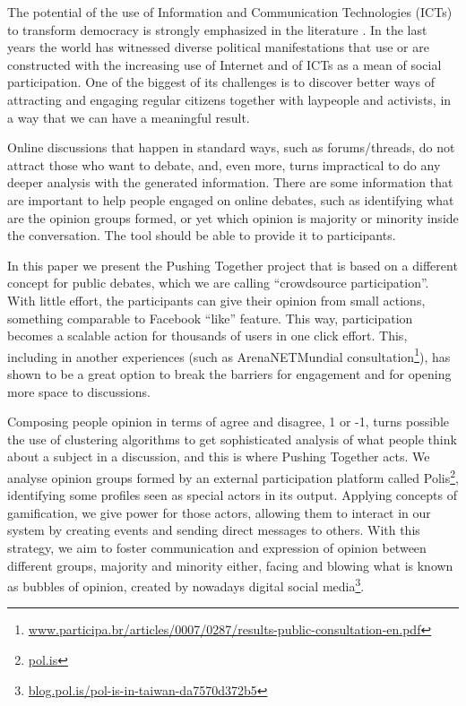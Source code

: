 \documentclass{llncs}
\begin{document}
  The potential of the use of Information and Communication Technologies (ICTs)
to transform democracy is strongly emphasized in the literature
\cite{benkler} \cite{castells} \cite{levy}. In the last years the world has
witnessed diverse political manifestations that use or are constructed with
the increasing use of Internet and of ICTs as a mean of social participation.
One of the biggest of its challenges is to discover better ways of attracting
and engaging regular citizens together with laypeople and activists, in a way
that we can have a meaningful result.

  Online discussions that happen in standard ways, such as forums/threads, do
not attract those who want to debate, and, even more, turns
impractical to do any deeper analysis with the generated information. There are
some information that are important to help people engaged on online debates,
such as identifying what are the opinion groups formed, or yet which opinion is
majority or minority inside the conversation. The tool should be able to provide
it to participants.

  In this paper we present the Pushing Together project that is based on a
different concept for public debates, which we are calling ``crowdsource
participation''. With little effort, the participants can give their
opinion from small actions, something comparable to Facebook ``like'' feature.
This way, participation becomes a scalable action for thousands of users in
one click effort. This, including in another experiences (such as ArenaNETMundial
consultation\footnote{\url{www.participa.br/articles/0007/0287/results-public-consultation-en.pdf}}),
has shown to be a great option to break
the barriers for engagement and for opening more space to discussions.

  Composing people opinion in terms of agree and disagree, 1 or -1, turns
possible the use of clustering algorithms to get sophisticated analysis of what
people think about a subject in a discussion, and this is where Pushing
Together acts. We analyse opinion groups formed by an external participation
platform called Polis\footnote{\url{pol.is}},
identifying some profiles seen as special actors in its output.
Applying concepts of gamification, we give power for those
actors, allowing them to interact in our system by creating events and
sending direct messages to others. With this strategy, we aim to foster
communication and expression of opinion between different groups, majority and
minority either, facing and blowing what is known as
bubbles of opinion, created by nowadays digital
social media\footnote{\url{blog.pol.is/pol-is-in-taiwan-da7570d372b5}}.
\end{document}
